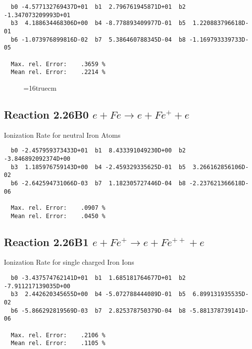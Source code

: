 \documentclass[12pt,dvipdfmx]{article}
\begin{document}
\begin{small}\begin{verbatim}
  b0 -4.577132769437D+01  b1  2.796761945871D+01  b2 -1.347073209993D+01
  b3  4.188634468306D+00  b4 -8.778893409977D-01  b5  1.220883796618D-01
  b6 -1.073976899816D-02  b7  5.386460788345D-04  b8 -1.169793339733D-05

  Max. rel. Error:    .3659 %
  Mean rel. Error:    .2214 %

\end{verbatim}\end{small}


\begin{figure} \label{2.18B}
\epsfxsize=16truecm
\end{figure}
\newpage



\subsection{
Reaction 2.26B0   $e + Fe  \rightarrow e + Fe^+  + e$
}

  Ionization Rate for neutral Iron Atoms

\begin{small}\begin{verbatim}
  b0 -2.457959373433D+01  b1  8.433391049230D+00  b2 -3.846892092374D+00
  b3  1.185976759143D+00  b4 -2.459329335625D-01  b5  3.266162856106D-02
  b6 -2.642594731066D-03  b7  1.182305727446D-04  b8 -2.237621366618D-06

  Max. rel. Error:    .0907 %
  Mean rel. Error:    .0450 %

\end{verbatim}\end{small}



\subsection{
Reaction 2.26B1   $e + Fe^+ \rightarrow e + Fe^{++} + e$
}

  Ionization Rate for single charged Iron Ions

\begin{small}\begin{verbatim}
  b0 -3.437574762141D+01  b1  1.685181764677D+01  b2 -7.911217139035D+00
  b3  2.442620345655D+00  b4 -5.072788444089D-01  b5  6.899131935535D-02
  b6 -5.866292819569D-03  b7  2.825378750379D-04  b8 -5.881378739141D-06

  Max. rel. Error:    .2106 %
  Mean rel. Error:    .1105 %


\end{verbatim}\end{small}
\end{document}
